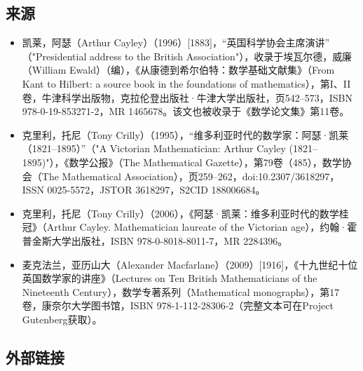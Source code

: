 \subsection{来源} 
\begin{itemize}
\item 凯莱，阿瑟（Arthur Cayley）（1996）[1883]，“英国科学协会主席演讲” （"Presidential address to the British Association"），收录于埃瓦尔德，威廉（William Ewald）（编），《从康德到希尔伯特：数学基础文献集》（From Kant to Hilbert: a source book in the foundations of mathematics），第I、II卷，牛津科学出版物，克拉伦登出版社·牛津大学出版社，页542–573，ISBN 978-0-19-853271-2，MR 1465678。该文也被收录于《数学论文集》第11卷。  
\item 克里利，托尼（Tony Crilly）（1995），“维多利亚时代的数学家：阿瑟·凯莱（1821–1895）”（"A Victorian Mathematician: Arthur Cayley (1821–1895)"），《数学公报》（The Mathematical Gazette），第79卷（485），数学协会（The Mathematical Association），页259–262，doi:10.2307/3618297，ISSN 0025-5572，JSTOR 3618297，S2CID 188006684。  
\item 克里利，托尼（Tony Crilly）（2006），《阿瑟·凯莱：维多利亚时代的数学桂冠》（Arthur Cayley. Mathematician laureate of the Victorian age），约翰·霍普金斯大学出版社，ISBN 978-0-8018-8011-7，MR 2284396。  
\item 麦克法兰，亚历山大（Alexander Macfarlane）（2009）[1916]，《十九世纪十位英国数学家的讲座》（Lectures on Ten British Mathematicians of the Nineteenth Century），数学专著系列（Mathematical monographs），第17卷，康奈尔大学图书馆，ISBN 978-1-112-28306-2（完整文本可在Project Gutenberg获取）。  
\end{itemize}
\subsection{外部链接}
